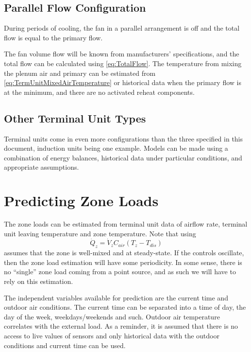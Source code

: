 \subsection{Parallel Flow Configuration}

During periods of cooling, the fan in a parallel arrangement is off and the
total flow is equal to the primary flow.

The fan volume flow will be known from manufacturers' specifications, and
the total flow can be calculated using  \ref{eq:TotalFlow}.
The temperature from mixing the plenum air and primary can be estimated
from  \ref{eq:TermUnitMixedAirTemperature} or historical
data when the primary flow is at the minimum, and there are no activated
reheat components.

\subsection{Other Terminal Unit Types}

Terminal units come in even more configurations than the three specified
in this document, induction units being one example. Models can be made
using a combination of energy balances, historical data under particular
conditions, and appropriate assumptions.


\section{Predicting Zone Loads}\label{sec:PredictingZoneLoads}

The zone loads can be estimated from terminal unit data of airflow rate,
terminal unit leaving temperature and zone temperature. Note that using
%
\begin{equation} \dot Q_{z} = \dot V_{z} C_{air} \left(T_{z}-T_{dis} \right) \end{equation}
%
assumes that the zone is well-mixed and at steady-state. If the
controls oscillate, then the zone load estimation will have some
periodicity. In some sense, there is no ``single'' zone load coming from
a point source, and as such we will have to rely on this estimation.

The independent variables available for prediction are the current time
and outdoor air conditions. The current time can be separated into a
time of day, the day of the week, weekdays/weekends and such. Outdoor air
temperature correlates with the external load. As a reminder, 
it is assumed that there is no access to live values of sensors and only
historical data with the outdoor conditions and current time can be used.

